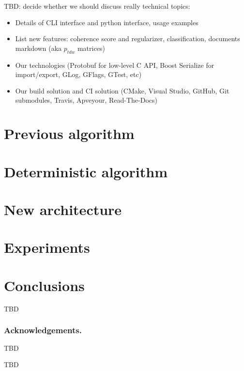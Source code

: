 \documentclass[russian,english]{llncs}
\begin{document}
TBD: decide whether we should discuss really technical topics:
\begin{itemize}
    \item Details of CLI interface and python interface, usage examples
    \item List new features: coherence score and regularizer, classification, documents markdown (aka $p_{tdw}$ matrices)
    \item Our technologies (Protobuf for low-level C API, Boost Serialize for import/export, GLog, GFlags, GTest, etc)
    \item Our build solution and CI solution (CMake, Visual Studio, GitHub, Git submodules, Travis, Apveyour, Read-The-Docs)
\end{itemize}

\section{Previous algorithm}
\label{sec:Previous}

\section{Deterministic algorithm}
\label{sec:Algorithm}

\section{New architecture}
\label{sec:Architecture}

\section{Experiments}
\label{sec:Experiments}

\section{Conclusions}
\label{sec:Conclusions}

TBD

\bigskip
\subsubsection*{Acknowledgements.}

TBD

%
%

\begin{thebibliography}{10}

TBD

\end{thebibliography}
\end{document}
